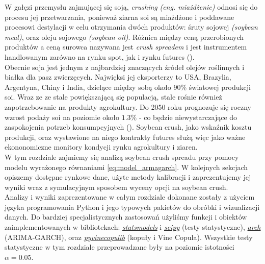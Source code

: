 W gałęzi przemysłu zajmującej się soją, \emph{crushing} \emph{(eng. miażdżenie)} odnosi się do procesu jej przetwarzania, ponieważ ziarna soi są miażdżone i poddawane procesowi destylacji w celu otrzymania dwóch produktów: śruty sojowej \emph{(soybean meal)}, oraz oleju sojowego \emph{(soybean oil)}. Różnica między ceną przerobionych produktów a ceną surowca nazywana jest \emph{crush spreadem} i jest instrumentem handlowanym zarówno na rynku spot, jak i rynku futures (\cite{CME_soybean}).\\
Obecnie soja jest jednym z najbardziej znaczących źródeł olejów roślinnych i białka dla pasz zwierzęcych. Najwięksi jej eksporterzy to USA, Brazylia, Argentyna, Chiny i India, dzielące między sobą około 90\% światowej produkcji soi. Wraz ze ze stale powiększającą się populacją, stale rośnie również zapotrzebowanie na produkty agrokultury. Do 2050 roku prognozuje się roczny wzrost podaży soi na poziomie około $1.3\%$ - co będzie niewystarczające do zaspokojenia potrzeb konsumpcyjnych (\cite{Pagano_Soybean_importance}). Soybean crush, jako wskaźnik kosztu produkcji, oraz wystawione na niego kontrakty futures służą więc jako ważne ekononomiczne monitory kondycji rynku agrokultury i ziaren.\\

W tym rozdziale zajmiemy się analizą soybean crush spreadu przy pomocy modelu wyrażonego równaniami \ref{eq:model_armagarch}. W kolejnych sekcjach opiszemy dostępne rynkowe dane, użyte metody kalibracji i zaprezentujemy jej wyniki wraz z symulacyjnym sposobem wyceny opcji na soybean crush.\\
Analizy i wyniki zaprezentowane w całym rozdziale dokonane zostały z użyciem języka programowania Python i jego typowych pakietów do obróbki i wizualizacji danych. Do bardziej specjalistycznych zastosowań użyliśmy funkcji i obiektów zaimplementowanych w bibliotekach: \href{https://www.statsmodels.org/stable/index.html}{\emph{statsmodels}} i \href{https://docs.scipy.org/doc/scipy/}{\emph{scipy}} (testy statystyczne), \href{https://arch.readthedocs.io/en/latest/univariate/introduction.html}{\emph{arch}} (ARIMA-GARCH), oraz \href{https://vinecopulib.github.io/pyvinecopulib/}{\emph{pyvinecopulib}} (kopuły i Vine Copula). Wszystkie testy statystyczne w tym rozdziale przeprowadzane były na poziomie istotności $\alpha = 0.05$.